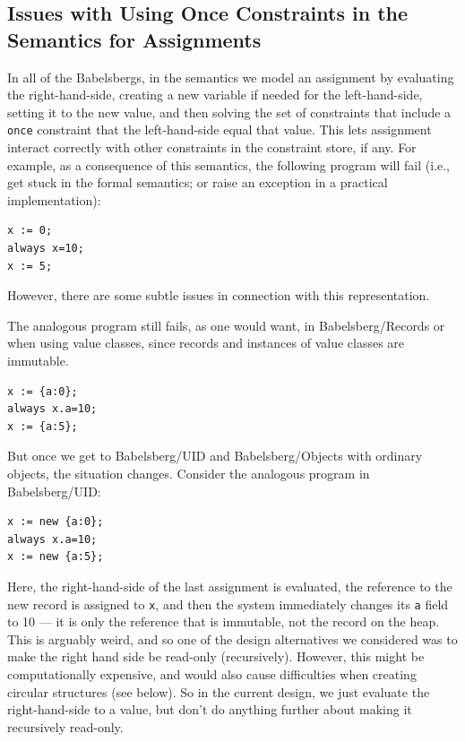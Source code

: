 \documentclass{article}
\begin{document}
\subsection{Issues with Using Once Constraints in the Semantics 
  for Assignments}

In all of the Babelsbergs, in the semantics we model an assignment by
evaluating the right-hand-side, creating a new variable if needed for
the left-hand-side, setting it to the new value, and then solving the
set of constraints that include a \verb|once| constraint that the
left-hand-side equal that value.  This lets assignment interact
correctly with other constraints in the constraint store, if any.  For
example, as a consequence of this semantics, the following program
will fail (i.e., get stuck in the formal semantics; or raise an
exception in a practical implementation):

\begin{verbatim}
x := 0;
always x=10;
x := 5;
\end{verbatim}

However, there are some subtle issues in connection with this representation.

The analogous program still fails, as one would want, in
Babelsberg/Records or when using value classes, since records and
instances of value classes are immutable.

\begin{verbatim}
x := {a:0};
always x.a=10;
x := {a:5};
\end{verbatim}


But once we get to Babelsberg/UID and Babelsberg/Objects with ordinary
objects, the situation changes.  Consider the analogous program in
Babelsberg/UID:
\begin{verbatim}
x := new {a:0};
always x.a=10;
x := new {a:5};
\end{verbatim}

Here, the right-hand-side of the last assignment is evaluated, the
reference to the new record is assigned to \verb|x|, and then the
system immediately changes its \verb|a| field to 10 --- it is only the
reference that is immutable, not the record on the heap.  This is
arguably weird, and so one of the design alternatives we considered
was to make the right hand side be read-only (recursively).  However,
this might be computationally expensive, and would also cause
difficulties when creating circular structures (see below).  So in the
current design, we just evaluate the right-hand-side to a value, but
don't do anything further about making it recursively read-only.
\end{document}

